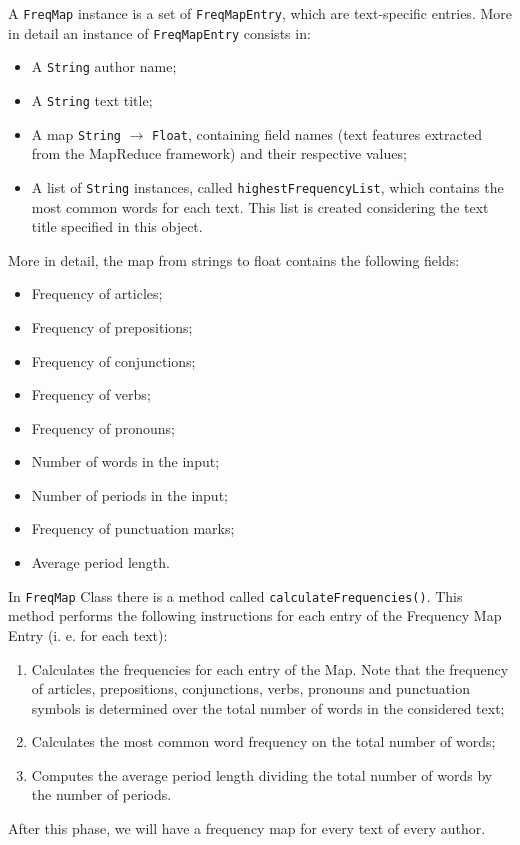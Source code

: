 \documentclass[a4paper,11pt, twoside]{article}
\begin{document}
		\noindent
		A \lstinline|FreqMap| instance is a set of \lstinline|FreqMapEntry|, which are text-specific entries. More in detail an instance of \lstinline|FreqMapEntry| consists in: \begin{itemize}
			\item A \lstinline|String| author name;
			\item A \lstinline|String| text title;
			\item A map \lstinline|String| $\to$ \lstinline|Float|, containing field names (text features extracted from the MapReduce framework) and their respective values;
			\item  A list of \lstinline|String| instances, called \lstinline|highestFrequencyList|, which contains the most common words for each text. This list is created considering the text title specified in this object.
		\end{itemize}

		\noindent
		More in detail, the map from strings to float contains the following fields: 
		\begin{multicols}{2}
			\begin{itemize}
				\item Frequency of articles;
				\item Frequency of prepositions;
				\item Frequency of conjunctions;
				\item Frequency of verbs;
				\item Frequency of pronouns;
				\item Number of words in the input;
				\item Number of periods in the input;
				\item Frequency of punctuation marks;
				\item Average period length.
			\end{itemize}
		\end{multicols}

		\noindent
		In \lstinline|FreqMap| Class there is a method called \lstinline|calculateFrequencies()|. This method performs the following instructions for each entry of the Frequency Map Entry (i. e. for each text):
		\begin{enumerate}
			\item Calculates the frequencies for each entry of the Map. Note that the frequency of articles, prepositions, conjunctions, verbs, pronouns and punctuation symbols is determined over the total number of words in the considered text;
			\item Calculates the most common word frequency on the total number of words;
			\item Computes the average period length dividing the total number of words by the number of periods.
		\end{enumerate}
		After this phase, we will have a frequency map for every text of every author.
\end{document}
